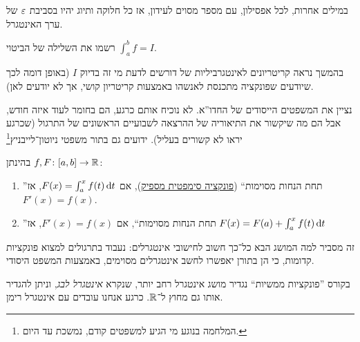 \documentclass[]{../../../../tex/classes/styledArticle}
\begin{document}
	במילים אחרות, לכל אפסילון, עם מספר מסוים לעידון, אז כל חלוקה ותיוג יהיו בסביבת $\eg$ של ערך האינטגרל. 
	
	
	
	\begin{Exercise}
		רשמו את השלילה של הביטוי $\int^{b}_a f = I$. 
	\end{Exercise}
	
	בהמשך נראה קריטריונים לאינטגרביליות של דורשים לדעת מי זה בדיוק $I$ (באופן דומה לכך שיודעים שפונקציה מתכנסת לאנשהו באמצעות קריטריון קושי, אך לא יודעים לאן). 
	
	נציין את המשפטים הייסודים של החדו''א. לא נוכיח אותם כרגע, הם בחומר לעוד איזה חודש, אבל הם מה שיקשור את התיאוריה של ההרצאה לשבועיים הראשונים של התרגול (שכרגע יראו לא קשורים בעליל). ידועים גם בתור משפטי ניוטון־לייבניץ\footnote{המלחמה בנוגע מי הגיע למשפטים קודם, נמשכת עד היום. }
	
	בהינתן $f, F \colon [a, b] \to \mathbb{R}$: 
	\begin{enumerate}
		\item ''תחת הנחות מסוימות`` (\href{https://eincyclopedia.org/wiki/\%D7\%A4\%D7\%95\%D7\%A0\%D7\%A7\%D7\%A6\%D7\%99\%D7\%94\_\%D7\%A1\%D7\%99\%D7\%9E\%D7\%A4\%D7\%98\%D7\%99\%D7\%AA}{פונקציה סימפטית מספיק}), אם $F(x) = \int^{x}_a f(t) \,\mathrm{d}t$, אז $F'(x) = f(x)$. 
		\item ''תחת הנחות מסוימות``, אם $F'(x) = f(x)$, אז $F(x) = F(a) + \int^{x}_af(t)\,\mathrm{d}t$
	\end{enumerate}
	זה מסביר למה המושג הבא כל־כך חשוב לחישובי אינטגרלים: 
	נעבוד בתרגולים למצוא פונקציות קדומות, כי הן בתורן יאפשרו לחשב אינטגרלים מסוימים, באמצעות המשפט היסודי. 
	
	בקורס ''פונקציות ממשיות`` נגדיר מושג אינטגרל רחב יותר, שנקרא \textit{אינטגרל לבג}, וניתן להגדיר אותו גם מחוץ ל־$\mathbb{R}$. כרגע אנחנו עובדים עם אינטגרל רימן. 
	
\end{document}

